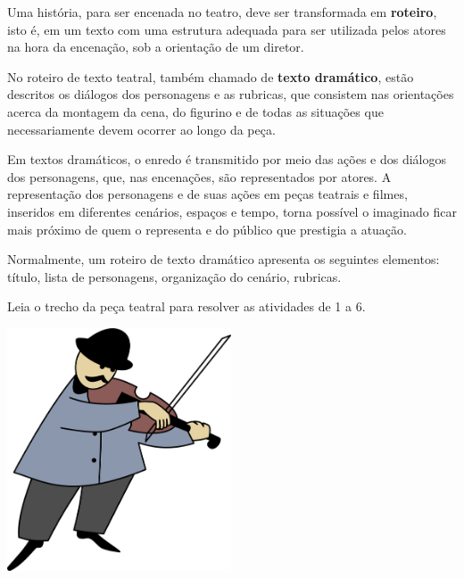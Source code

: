 \begin{boxlist}
{Uma história, para ser encenada no teatro, deve ser transformada em
\textbf{roteiro}, isto é, em um texto com uma estrutura adequada para
ser utilizada pelos atores na hora da encenação, sob a orientação de um
diretor.

No roteiro de texto teatral, também chamado de \textbf{texto dramático},
estão descritos os diálogos dos personagens e as rubricas, que consistem
nas orientações acerca da montagem da cena, do figurino e de todas as
situações que necessariamente devem ocorrer ao longo da peça.

Em textos dramáticos, o enredo é transmitido por meio das ações e dos
diálogos dos personagens, que, nas encenações, são representados por
atores. A representação dos personagens e de suas ações em peças
teatrais e filmes, inseridos em diferentes cenários, espaços e tempo,
torna possível o imaginado ficar mais próximo de quem o representa e do
público que prestigia a atuação.

Normalmente, um roteiro de texto dramático apresenta os seguintes
elementos: título, lista de personagens, organização do cenário,
rubricas.}


Leia o trecho da peça teatral para resolver as atividades de 1 a 6.



\includegraphics[width=2.61389in,height=2.83858in]{media/image2.png}


\end{boxlist}
